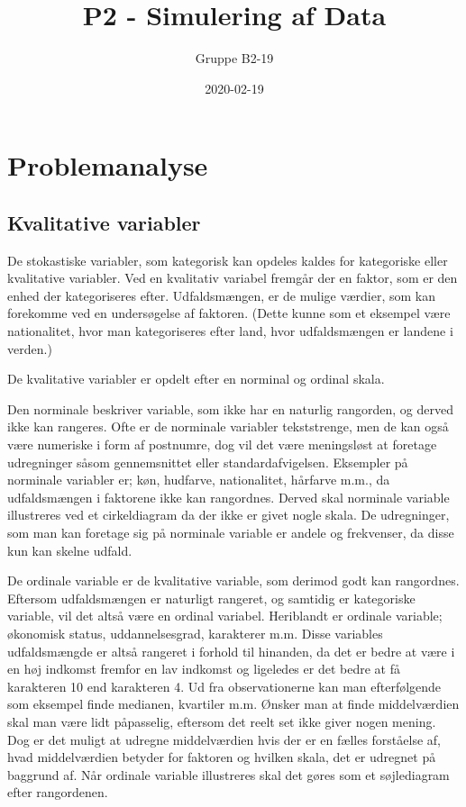 \documentclass[]{book}
\title{P2 - Simulering af Data}
\author{Gruppe B2-19}
\date{2020-02-19}
\theoremstyle{definition}
\theoremstyle{definition}
\theoremstyle{definition}
\theoremstyle{remark}
\begin{document}
\maketitle

{
\setcounter{tocdepth}{1}
\tableofcontents
}
\hypertarget{problemanalyse}{%
\chapter{Problemanalyse}\label{problemanalyse}}

\hypertarget{kvalitative-variabler}{%
\section{Kvalitative variabler}\label{kvalitative-variabler}}

De stokastiske variabler, som kategorisk kan opdeles kaldes for kategoriske eller kvalitative variabler. Ved en kvalitativ variabel fremgår der en faktor, som er den enhed der kategoriseres efter. Udfaldsmængen, er de mulige værdier, som kan forekomme ved en undersøgelse af faktoren. (Dette kunne som et eksempel være nationalitet, hvor man kategoriseres efter land, hvor udfaldsmængen er landene i verden.)

De kvalitative variabler er opdelt efter en norminal og ordinal skala.

Den norminale beskriver variable, som ikke har en naturlig rangorden, og derved ikke kan rangeres. Ofte er de norminale variabler tekststrenge, men de kan også være numeriske i form af postnumre, dog vil det være meningsløst at foretage udregninger såsom gennemsnittet eller standardafvigelsen. Eksempler på norminale variabler er; køn, hudfarve, nationalitet, hårfarve m.m., da udfaldsmængen i faktorene ikke kan rangordnes. Derved skal norminale variable illustreres ved et cirkeldiagram da der ikke er givet nogle skala. De udregninger, som man kan foretage sig på norminale variable er andele og frekvenser, da disse kun kan skelne udfald.

De ordinale variable er de kvalitative variable, som derimod godt kan rangordnes. Eftersom udfaldsmængen er naturligt rangeret, og samtidig er kategoriske variable, vil det altså være en ordinal variabel. Heriblandt er ordinale variable; økonomisk status, uddannelsesgrad, karakterer m.m. Disse variables udfaldsmængde er altså rangeret i forhold til hinanden, da det er bedre at være i en høj indkomst fremfor en lav indkomst og ligeledes er det bedre at få karakteren 10 end karakteren 4. Ud fra observationerne kan man efterfølgende som eksempel finde medianen, kvartiler m.m. Ønsker man at finde middelværdien skal man være lidt påpasselig, eftersom det reelt set ikke giver nogen mening. Dog er det muligt at udregne middelværdien hvis der er en fælles forståelse af, hvad middelværdien betyder for faktoren og hvilken skala, det er udregnet på baggrund af. Når ordinale variable illustreres skal det gøres som et søjlediagram efter rangordenen.
\end{document}
